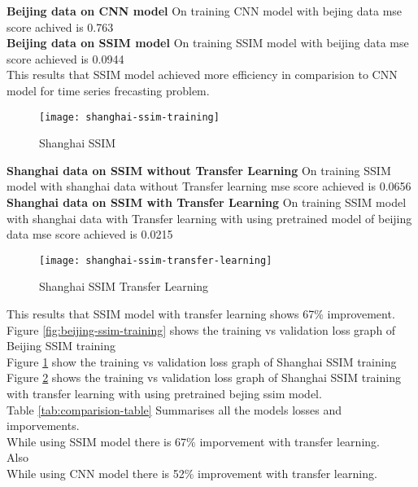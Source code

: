 \textbf{Beijing data on CNN model}
On training CNN model with bejing data mse score achived is 0.763 \\

\textbf{Beijing data on SSIM model}
On training SSIM model with beijing data mse score achieved is 0.0944 \\

This results that SSIM model achieved more efficiency in comparision to CNN model for time series frecasting problem.\\



\begin{figure}[ht]
	\centering
	\texttt{[image: shanghai-ssim-training]}
	\caption{Shanghai SSIM}
	\label{fig:shanghai-ssim-training}
\end{figure}

\textbf{Shanghai data on SSIM without Transfer Learning}
On training SSIM model with shanghai data without Transfer learning mse score achieved is 0.0656\\

\textbf{Shanghai data on SSIM with Transfer Learning}
On training SSIM model with shanghai data with Transfer learning with using pretrained model of beijing data mse score achieved is 0.0215 \\

\begin{figure}[ht]
	\centering
	\texttt{[image: shanghai-ssim-transfer-learning]}
	\caption{Shanghai SSIM Transfer Learning}
	\label{fig:shanghai-ssim-transfer-learning}
\end{figure}


This results that SSIM model with transfer learning shows 67\% improvement. \\

Figure \ref{fig:beijing-ssim-training} shows the training vs validation loss graph of Beijing SSIM training \\

Figure \ref{fig:shanghai-ssim-training} show the training vs validation loss graph of Shanghai SSIM training \\

Figure \ref{fig:shanghai-ssim-transfer-learning} shows the training vs validation loss graph of Shanghai SSIM training with transfer learning with using pretrained bejing ssim model. \\

Table \ref{tab:comparision-table} Summarises all the models losses and imporvements. \\

While using SSIM model there is 67\% imporvement with transfer learning.\\

Also\\

While using CNN model there is 52\% improvement with transfer learning. \\






